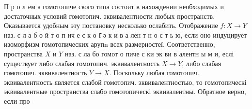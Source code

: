 \documentclass[10pt]{article}
\begin{document}
П р о л ем а гомотопиче ского типа состоит в нахождении необходимых и достаточных условий гомотопич. эквивалентности любых пространств. Оказывается удобным эту постановку несколько ослабить. Отображение $f: X \rightarrow Y$ наз. с л а б о й т о п ич е с к о І̆ $ә$ к и в а лен т н о с т ь ю, если оно индуцирует изоморфизм гомотопических арупn всех размерностеї. Соответственно, пространства $X$ и $Y$ наз. с ла бо гомот о пиче с ки эк ви в алентн ы м и, еслі существует либо слабая гомотопич. эквивалентность $X \rightarrow Y$, либо слабая гомотопич. эквивалентность $Y \rightarrow X$. Поскольку любая гомотопич. эквивалентность является слабой гомотопич. эквивалентностью, то гомотопическі эквивалентные пространства слабо гомотопическі эквивалентны. Обратное верно, если про-
\end{document}
